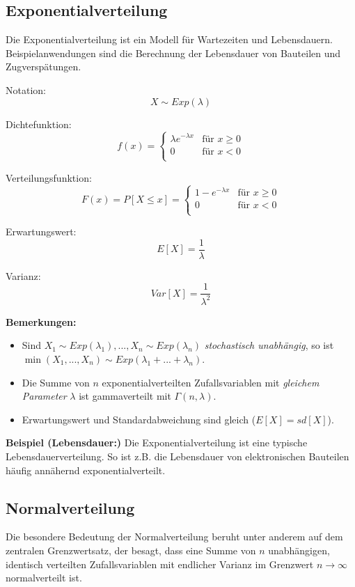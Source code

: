 \documentclass[10pt,a4paper,twocolumn]{article}
\begin{document}
\subsection{Exponentialverteilung}
Die Exponentialverteilung ist ein Modell für Wartezeiten und Lebensdauern. Beispielanwendungen sind die Berechnung der Lebensdauer von Bauteilen und Zugverspätungen.

\vspace{10pt}

Notation:
\[
X \sim Exp(\lambda)
\]

Dichtefunktion:
\[
f(x)=
\begin{cases}
	\lambda e^{- \lambda x} & \text{für $x \geq 0$} \\
	0 & \text{für $x < 0$} \\
\end{cases} 
\]

Verteilungsfunktion:
\[
F(x)=P[X \leq x]=
\begin{cases}
	1-e^{- \lambda x} & \text{für $x \geq 0$} \\	
	0 & \text{für $x < 0$} \\
\end{cases} 
\]

Erwartungswert:
\[
E[X]=\frac{1}{\lambda}
\]

Varianz:
\[
Var[X]=\frac{1}{\lambda^{2}}
\]

\textbf{Bemerkungen:}
\begin{itemize}
\item Sind $X_1\sim Exp(\lambda_1), ..., X_n\sim Exp(\lambda_n)$ \emph{stochastisch unabhängig}, so ist $\min(X_1, ...,X_n)\sim Exp(\lambda_1+...+\lambda_n)$.
\item Die Summe von $n$ exponentialverteilten Zufallsvariablen mit \emph{gleichem Parameter} $\lambda$ ist gammaverteilt mit $\Gamma(n,\lambda)$.
\item Erwartungswert und Standardabweichung sind gleich ($E[X]=sd[X]$).
\end{itemize}

\textbf{Beispiel (Lebensdauer:)} Die Exponentialverteilung ist eine typische Lebensdauerverteilung. So ist z.B. die Lebensdauer von elektronischen Bauteilen häufig annähernd exponentialverteilt.

\subsection{Normalverteilung}
Die besondere Bedeutung der Normalverteilung beruht unter anderem auf dem zentralen Grenzwertsatz, der besagt, dass eine Summe von $n$ unabhängigen, identisch verteilten Zufallsvariablen mit endlicher Varianz im Grenzwert $n\rightarrow\infty$ normalverteilt ist.
\end{document}
